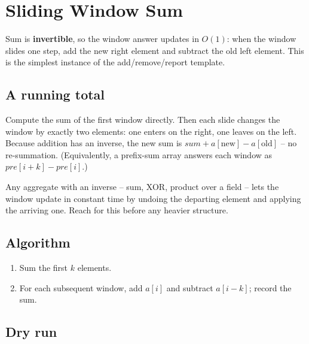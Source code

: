 \section{Sliding Window Sum}
\label{sec:cses-sw-sum}


\begin{patternbox}
Sum is \textbf{invertible}, so the window answer updates in $O(1)$: when
the window slides one step, add the new right element and subtract the old
left element. This is the simplest instance of the add/remove/report
template.
\end{patternbox}

\subsection*{A running total}

Compute the sum of the first window directly. Then each slide changes the
window by exactly two elements: one enters on the right, one leaves on the
left. Because addition has an inverse, the new sum is
$\textit{sum}+a[\text{new}]-a[\text{old}]$ -- no re-summation. (Equivalently,
a prefix-sum array answers each window as $\textit{pre}[i+k]-\textit{pre}
[i]$.)

\begin{ideabox}
Any aggregate with an inverse -- sum, XOR, product over a field -- lets the
window update in constant time by undoing the departing element and
applying the arriving one. Reach for this before any heavier structure.
\end{ideabox}

\subsection*{Algorithm}

\begin{enumerate}
  \item Sum the first $k$ elements.
  \item For each subsequent window, add $a[i]$ and subtract $a[i-k]$;
        record the sum.
\end{enumerate}

\subsection*{Dry run}

